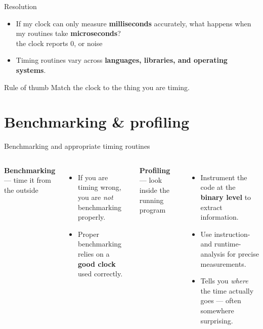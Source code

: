 \documentclass[aspectratio=169]{beamer}
\newcommand{\cplx}[1]{{\footnotesize\color{cookieMuted}#1}}
\begin{document}
\begin{frame}{Resolution}
  \begin{itemize}\setlength\itemsep{8pt}
    \item If my clock can only measure \textbf{milliseconds} accurately, what
      happens when my routines take \textbf{microseconds}?
      \\ \cplx{the clock reports 0, or noise}
    \item Timing routines vary across \textbf{languages, libraries, and operating
      systems}.
  \end{itemize}
  \bigskip
  \begin{block}{Rule of thumb}
    Match the clock to the thing you are timing.
  \end{block}
\end{frame}

\section{Benchmarking \& profiling}

\begin{frame}{Benchmarking and appropriate timing routines}
  \begin{columns}[T,onlytextwidth]
      \textbf{Benchmarking} --- time it from the outside
      \begin{itemize}\setlength\itemsep{3pt}
        \item If you are timing wrong, you are \emph{not} benchmarking properly.
        \item Proper benchmarking relies on a \textbf{good clock} used correctly.
      \end{itemize}
      \textbf{Profiling} --- look inside the running program
      \begin{itemize}\setlength\itemsep{3pt}
        \item Instrument the code at the \textbf{binary level} to extract information.
        \item Use instruction- and runtime-analysis for precise measurements.
        \item Tells you \emph{where} the time actually goes --- often somewhere surprising.
      \end{itemize}
  \end{columns}
\end{frame}

\end{document}
